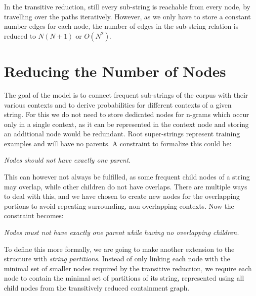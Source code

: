 In the transitive reduction, still every sub-string is reachable from every node, by travelling over the paths iteratively. However, as we only have to store a constant number edges for each node, the number of edges in the sub-string relation is reduced to $N(N + 1)$ or $O(N^2)$.

\section{Reducing the Number of Nodes}\label{sec:frequency_reduction}
The goal of the model is to connect frequent sub-strings of the corpus with their various contexts and to derive probabilities for different contexts of a given string. For this we do not need to store dedicated nodes for n-grams which occur only in a single context, as it can be represented in the context node and storing an additional node would be redundant. Root super-strings represent training examples and will have no parents. A constraint to formalize this could be:\par
\emph{Nodes should not have exactly one parent}.

This can however not always be fulfilled, as some frequent child nodes of a string may overlap, while other children do not have overlaps. There are multiple ways to deal with this, and we have chosen to create new nodes for the overlapping portions to avoid repeating surrounding, non-overlapping contexts. Now the constraint becomes:\par
\emph{Nodes must not have exactly one parent while having no overlapping children.}

\noindent To define this more formally, we are going to make another extension to the structure with \emph{string partitions}. Instead of only linking each node with the minimal set of smaller nodes required by the transitive reduction, we require each node to contain the minimal set of partitions of its string, represented using all child nodes from the transitively reduced containment graph.

